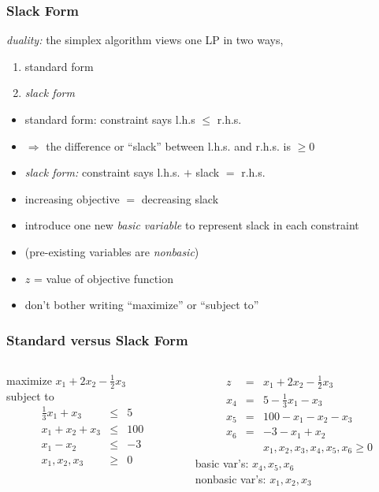 \documentclass{beamer}
\begin{document}
\begin{frame} \frametitle{Slack Form}
\emph{duality:} the simplex algorithm views one LP in two ways,
\begin{enumerate}
  \item standard form
  \item \emph{slack form}
\end{enumerate}
\begin{itemize}
  \item standard form: constraint says l.h.s $\leq$ r.h.s.
  \item $\Rightarrow$ the difference or ``slack'' between l.h.s. and r.h.s.
    is $\geq 0$
  \item \emph{slack form:} constraint says l.h.s. $+$ slack $=$ r.h.s.
  \item increasing objective $=$ decreasing slack
  \item introduce one new \emph{basic variable} to represent slack in each constraint
  \item (pre-existing variables are \emph{nonbasic})
  \item $z$ = value of objective function
  \item don't bother writing ``maximize'' or ``subject to''
\end{itemize}
\end{frame}

\begin{frame} \frametitle{Standard versus Slack Form}
\begin{columns}
\begin{column}{.5\textwidth}
  maximize $x_1 + 2x_2 - \frac{1}{2} x_3$ \\
  subject to
  \begin{eqnarray*}
    \frac{1}{3} x_1 + x_3 &\leq& 5 \\
    x_1 + x_2 + x_3 &\leq& 100 \\
    x_1 - x_2 &\leq& -3 \\
    x_1, x_2, x_3 &\geq& 0
  \end{eqnarray*}
\end{column}
\begin{column}{.5\textwidth}
  \begin{eqnarray*}
    z &=& x_1 + 2x_2 - \frac{1}{2} x_3 \\
    x_4 &=& 5 - \frac{1}{3} x_1 - x_3 \\
    x_5 &=& 100 - x_1 - x_2 - x_3 \\
    x_6 &=& -3 -x_1 + x_2 \\
    & & x_1, x_2, x_3, x_4, x_5, x_6 \geq 0
  \end{eqnarray*}
  basic var's: $x_4, x_5, x_6$ \\
  nonbasic var's: $x_1, x_2, x_3$
\end{column}
\end{columns}
\end{frame}
\end{document}

